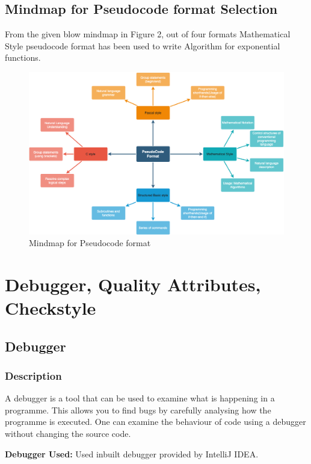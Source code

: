 \documentclass[a4paper,12pt]{report}
\begin{document}
\subsection{Mindmap for Pseudocode format Selection}
From the given blow mindmap in Figure 2, out of four formats Mathematical Style pseudocode format has been used to write Algorithm for exponential functions.

\begin{figure}[h]
\includegraphics[width=15cm]{Mindmap.png}
\caption{Mindmap for Pseudocode format}
\label{exp}
\end{figure}
\pagebreak

\section{Debugger, Quality Attributes, Checkstyle}
\subsection{Debugger}
\subsubsection{Description}A debugger is a tool that can be used to examine what is happening in a programme. This allows you to find bugs by carefully analysing how the programme is executed. One can examine the behaviour of code using a debugger without changing the source code.

\textbf{Debugger Used:} Used inbuilt debugger provided by IntelliJ IDEA.
\end{document}
